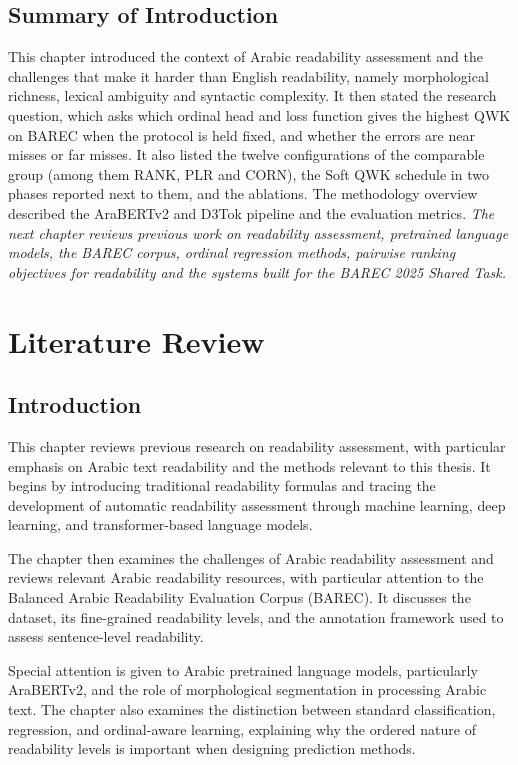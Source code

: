 \documentclass[12pt]{report}
\begin{document}
\section{Summary of Introduction}
This chapter introduced the context of Arabic readability assessment and the challenges that make it harder than English readability, namely morphological richness, lexical ambiguity and syntactic complexity. It then stated the research question, which asks which ordinal head and loss function gives the highest QWK on BAREC when the protocol is held fixed, and whether the errors are near misses or far misses. It also listed the twelve configurations of the comparable group (among them RANK, PLR and CORN), the Soft QWK schedule in two phases reported next to them, and the ablations. The methodology overview described the AraBERTv2 and D3Tok pipeline and the evaluation metrics.
\textit{The next chapter reviews previous work on readability assessment, pretrained language models, the BAREC corpus, ordinal regression methods, pairwise ranking objectives for readability and the systems built for the BAREC 2025 Shared Task.}
\chapter{Literature Review}
\label{chap:relatedwork}



\section{Introduction}

This chapter reviews previous research on readability assessment, with particular emphasis on Arabic text readability and the methods relevant to this thesis. It begins by introducing traditional readability formulas and tracing the development of automatic readability assessment through machine learning, deep learning, and transformer-based language models.

The chapter then examines the challenges of Arabic readability assessment and reviews relevant Arabic readability resources, with particular attention to the Balanced Arabic Readability Evaluation Corpus (BAREC). It discusses the dataset, its fine-grained readability levels, and the annotation framework used to assess sentence-level readability.

Special attention is given to Arabic pretrained language models, particularly AraBERTv2, and the role of morphological segmentation in processing Arabic text. The chapter also examines the distinction between standard classification, regression, and ordinal-aware learning, explaining why the ordered nature of readability levels is important when designing prediction methods.
\end{document}
